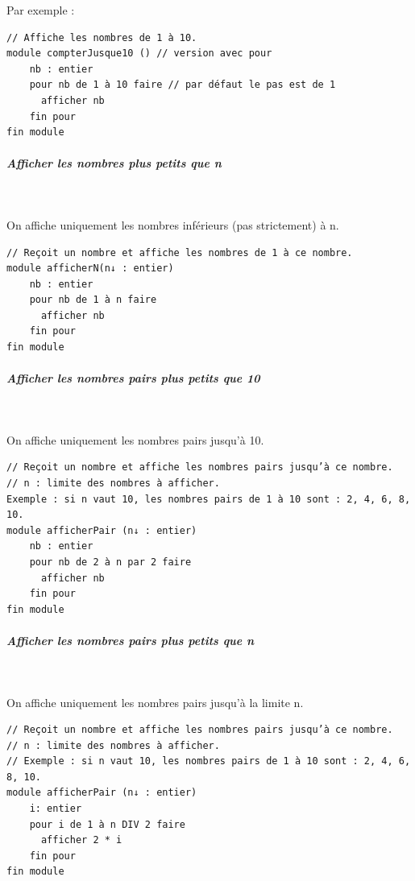 \documentclass[11pt,a4paper]{article}
\begin{document}
            \par
        Par exemple : 
            \par
        \begin{verbatim}
// Affiche les nombres de 1 à 10.
module compterJusque10 () // version avec pour
    nb : entier
    pour nb de 1 à 10 faire // par défaut le pas est de 1
      afficher nb
    fin pour
fin module
    \end{verbatim}
			
		\subparagraph{Afficher les nombres plus petits que n} 
		
					\textcolor{white}{.} \par
				On affiche uniquement les nombres inf\'erieurs (pas strictement) \`a n.
            \par
        \begin{verbatim}
// Reçoit un nombre et affiche les nombres de 1 à ce nombre.
module afficherN(n↓ : entier)
    nb : entier
    pour nb de 1 à n faire
      afficher nb
    fin pour
fin module
    \end{verbatim}
			
		\subparagraph{Afficher les nombres pairs plus petits que 10} 
		
					\textcolor{white}{.} \par
				On affiche uniquement les nombres pairs jusqu'\`a 10.
            \par
        \begin{verbatim}
// Reçoit un nombre et affiche les nombres pairs jusqu’à ce nombre.
// n : limite des nombres à afficher.
Exemple : si n vaut 10, les nombres pairs de 1 à 10 sont : 2, 4, 6, 8, 10.
module afficherPair (n↓ : entier)
    nb : entier
    pour nb de 2 à n par 2 faire
      afficher nb
    fin pour
fin module
    \end{verbatim}
			
		\subparagraph{Afficher les nombres pairs plus petits que n} 
		
					\textcolor{white}{.} \par
				On affiche uniquement les nombres pairs jusqu'\`a la limite n.
            \par
        \begin{verbatim}
// Reçoit un nombre et affiche les nombres pairs jusqu’à ce nombre.
// n : limite des nombres à afficher.
// Exemple : si n vaut 10, les nombres pairs de 1 à 10 sont : 2, 4, 6, 8, 10.
module afficherPair (n↓ : entier)
    i: entier
    pour i de 1 à n DIV 2 faire
      afficher 2 * i
    fin pour
fin module
    \end{verbatim}
			
\end{document}
